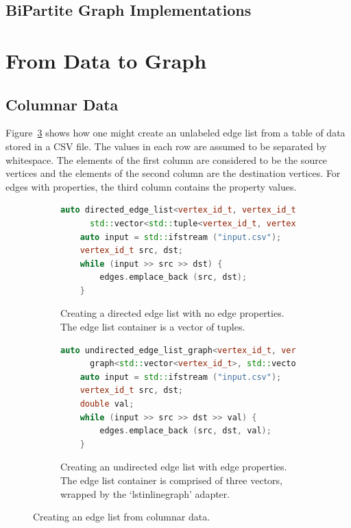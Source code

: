 \subsection{BiPartite Graph Implementations}



\section{From Data to Graph}

\subsection{Columnar Data}

Figure~\ref{fig:edge_list_from_columnar_data}
shows how one might create an unlabeled edge list from a table of data stored in a CSV file.
The values in each row are assumed to be separated by whitespace.
The elements of the first column are considered to be the source vertices and the elements of
the second column are the destination vertices. For edges with properties, the third column
contains the property values.

\begin{figure}[ht]
  \begin{center}
    \begin{subfigure}{0.48\textwidth}
      \begin{lstlisting}[language=C++]
    auto directed_edge_list<vertex_id_t, vertex_id_t>
      std::vector<std::tuple<vertex_id_t, vertex_id_t> edges;
    auto input = std::ifstream ("input.csv");
    vertex_id_t src, dst;
    while (input >> src >> dst) {
        edges.emplace_back (src, dst);
    }
      \end{lstlisting}
      \caption{Creating a directed edge list with no edge properties.
      The edge list container is a vector of tuples.
      \label{subfig:edge_list_no_properties}}
    \end{subfigure}
    \begin{subfigure}{0.48\textwidth}
      \begin{lstlisting}[language=C++]
    auto undirected_edge_list_graph<vertex_id_t, vertex_id_t, double>
      graph<std::vector<vertex_id_t>, std::vector<vertex_id_t>, std::vector<double>> edges;
    auto input = std::ifstream ("input.csv");
    vertex_id_t src, dst;
    double val;
    while (input >> src >> dst >> val) {
        edges.emplace_back (src, dst, val);
    }
      \end{lstlisting}
      \caption{Creating an undirected edge list with edge properties.
      The edge list container is comprised of three vectors, wrapped by
      the `lstinline{graph}' adapter.
      \label{subfig:edge_list_with_properties}}
    \end{subfigure}
    \caption{Creating an edge list from columnar data.\label{fig:edge_list_from_columnar_data}}
  \end{center}
\end{figure}

